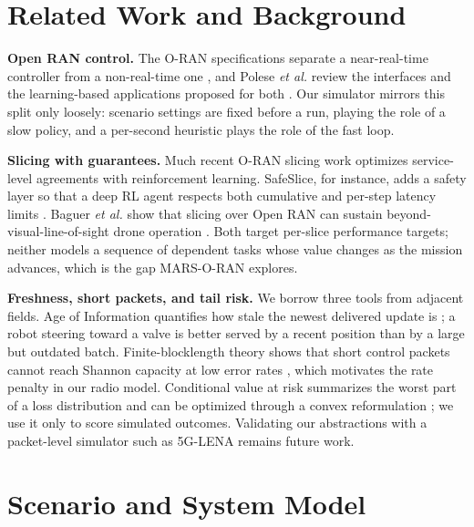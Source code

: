 \documentclass[conference]{IEEEtran}
\begin{document}
\section{Related Work and Background}
\textbf{Open RAN control.} The O-RAN specifications separate a near-real-time controller from a non-real-time one \cite{oranarch,oranwg3}, and Polese \emph{et al.} review the interfaces and the learning-based applications proposed for both \cite{polese}. Our simulator mirrors this split only loosely: scenario settings are fixed before a run, playing the role of a slow policy, and a per-second heuristic plays the role of the fast loop.

\textbf{Slicing with guarantees.} Much recent O-RAN slicing work optimizes service-level agreements with reinforcement learning. SafeSlice, for instance, adds a safety layer so that a deep RL agent respects both cumulative and per-step latency limits \cite{safeslice}. Baguer \emph{et al.} show that slicing over Open RAN can sustain beyond-visual-line-of-sight drone operation \cite{bvlos}. Both target per-slice performance targets; neither models a sequence of dependent tasks whose value changes as the mission advances, which is the gap MARS-O-RAN explores.

\textbf{Freshness, short packets, and tail risk.} We borrow three tools from adjacent fields. Age of Information quantifies how stale the newest delivered update is \cite{kaul,aoi}; a robot steering toward a valve is better served by a recent position than by a large but outdated batch. Finite-blocklength theory shows that short control packets cannot reach Shannon capacity at low error rates \cite{polyanskiy}, which motivates the rate penalty in our radio model. Conditional value at risk summarizes the worst part of a loss distribution and can be optimized through a convex reformulation \cite{cvar}; we use it only to score simulated outcomes. Validating our abstractions with a packet-level simulator such as 5G-LENA \cite{lena} remains future work.

\section{Scenario and System Model}
\end{document}
